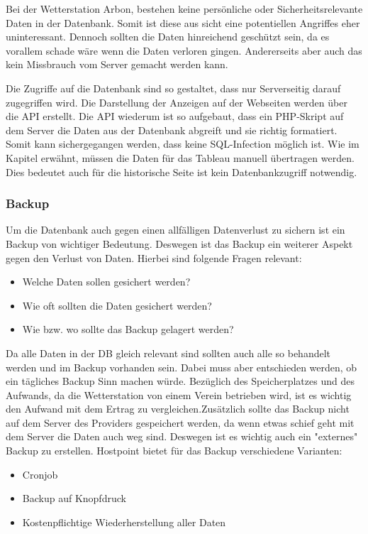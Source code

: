 Bei der Wetterstation Arbon, bestehen keine persönliche oder Sicherheitsrelevante Daten in der Datenbank. Somit ist diese aus sicht eine potentiellen Angriffes eher uninteressant. Dennoch sollten die Daten hinreichend geschützt sein, da es vorallem schade wäre wenn die Daten verloren gingen. Andererseits aber auch das kein Missbrauch vom Server gemacht werden kann.

Die Zugriffe auf die Datenbank sind so gestaltet, dass nur Serverseitig darauf zugegriffen wird. Die Darstellung der Anzeigen auf der Webseiten werden über die API erstellt. Die API wiederum ist so aufgebaut, dass ein PHP-Skript auf dem Server die Daten aus der Datenbank abgreift und sie richtig formatiert. Somit kann sichergegangen werden, dass keine SQL-Infection möglich ist. Wie im Kapitel  erwähnt, müssen die Daten für das Tableau manuell übertragen werden. Dies bedeutet auch für die historische Seite ist kein Datenbankzugriff notwendig. 

\subsubsection{Backup}

Um die Datenbank auch gegen einen allfälligen Datenverlust zu sichern ist ein Backup von wichtiger Bedeutung. Deswegen ist das Backup ein weiterer Aspekt gegen den Verlust von Daten. Hierbei sind folgende Fragen relevant:
\begin{itemize}
\item Welche Daten sollen gesichert werden?
\item Wie oft sollten die Daten gesichert werden?
\item Wie bzw. wo sollte das Backup gelagert werden?
\end{itemize}

Da alle Daten in der DB gleich relevant sind sollten auch alle so behandelt werden und im Backup vorhanden sein. Dabei muss aber entschieden werden, ob ein tägliches Backup Sinn machen würde. Bezüglich des Speicherplatzes und des Aufwands, da die Wetterstation von einem Verein betrieben wird, ist es wichtig den Aufwand mit dem Ertrag zu vergleichen.Zusätzlich sollte das Backup nicht auf dem Server des Providers gespeichert werden, da wenn etwas schief geht mit dem Server die Daten auch weg sind. Deswegen ist es wichtig auch ein "externes" Backup zu erstellen. Hostpoint bietet für das Backup verschiedene Varianten:
\begin{itemize}
\item Cronjob
\item Backup auf Knopfdruck
\item Kostenpflichtige Wiederherstellung aller Daten
\end{itemize}


